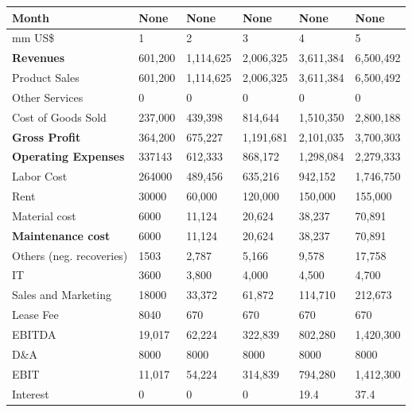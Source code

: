 \begin{tabular}{llllll}
\hline
 Month                      & None    & None      & None      & None      & None      \\
\hline
 mm US\$                     & 1       & 2         & 3         & 4         & 5         \\
 \textbf{Revenues}           & 601,200 & 1,114,625 & 2,006,325 & 3,611,384 & 6,500,492 \\
\hline 
 Product Sales              & 601,200 & 1,114,625 & 2,006,325 & 3,611,384 & 6,500,492 \\
 Other Services             & 0       & 0         & 0         & 0         & 0         \\
 Cost of Goods Sold         & 237,000 & 439,398   & 814,644   & 1,510,350 & 2,800,188 \\
 \textbf{Gross Profit}       & 364,200 & 675,227   & 1,191,681 & 2,101,035 & 3,700,303 \\
\hline 
 \textbf{Operating Expenses} & 337143  & 612,333   & 868,172   & 1,298,084 & 2,279,333 \\
 Labor Cost                 & 264000  & 489,456   & 635,216   & 942,152   & 1,746,750 \\
 Rent                       & 30000   & 60,000    & 120,000   & 150,000   & 155,000   \\
 Material cost              & 6000    & 11,124    & 20,624    & 38,237    & 70,891    \\
 \textbf{Maintenance cost}   & 6000    & 11,124    & 20,624    & 38,237    & 70,891    \\
 Others (neg. recoveries)   & 1503    & 2,787     & 5,166     & 9,578     & 17,758    \\
 IT                         & 3600    & 3,800     & 4,000     & 4,500     & 4,700     \\
 Sales and Marketing        & 18000   & 33,372    & 61,872    & 114,710   & 212,673   \\
 Lease Fee                  & 8040    & 670       & 670       & 670       & 670       \\
 EBITDA                     & 19,017  & 62,224    & 322,839   & 802,280   & 1,420,300 \\
 D\&A                        & 8000    & 8000      & 8000      & 8000      & 8000      \\
 EBIT                       & 11,017  & 54,224    & 314,839   & 794,280   & 1,412,300 \\
 Interest                   & 0       & 0         & 0         & 19.4      & 37.4      \\

\end{tabular}
